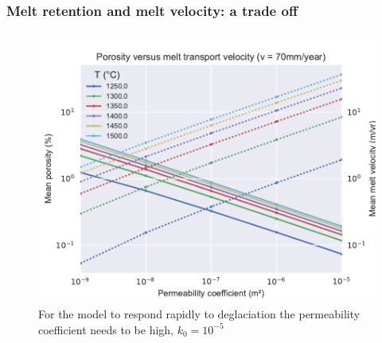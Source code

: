 \documentclass[aspectratio=169]{beamer}
\begin{document}
\begin{frame}
    \frametitle{Melt retention and melt velocity: a trade off}
    \begin{figure}
        \includegraphics[height=0.7\paperheight]{./figures/ch2-phi-vm.pdf}
        \caption{For the model to respond rapidly to deglaciation the permeability coefficient needs to be high, $k_{0}=10^{-5}$}
    \end{figure}
\end{frame}
\end{document}
